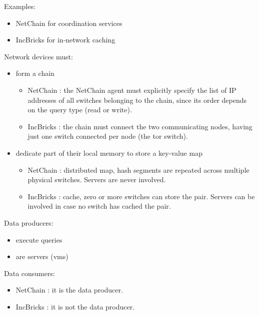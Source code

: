 Examples:
\begin{itemize}
    \item NetChain \cite{netchain} for coordination services
    \item IncBricks \cite{incbricks} for in-network caching
\end{itemize}
Network devices must:
\begin{itemize}
    \item form a chain
    \begin{itemize}
        \item NetChain \cite{netchain}: the NetChain \cite{netchain} agent must explicitly specify the list of IP addresses of all switches belonging to the chain, since its order depends on the query type (read or write).
        \item IncBricks \cite{incbricks}: the chain must connect the two communicating nodes, having just one switch connected per node (the \gls{tor} switch).
    \end{itemize}
    \item dedicate part of their local memory to store a key-value map
    \begin{itemize}
        \item NetChain \cite{netchain}: distributed map, hash segments are repeated across multiple physical switches. Servers are never involved.
        \item IncBricks \cite{incbricks}: cache, zero or more switches can store the pair. Servers can be involved in case no switch has cached the pair.
    \end{itemize}
\end{itemize}
Data producers:
\begin{itemize}
    \item execute queries
    \item are servers (\glspl{vm})
\end{itemize}
Data consumers:
\begin{itemize}
    \item NetChain \cite{netchain}: it is the data producer.
    \item IncBricks \cite{incbricks}: it is not the data producer.
\end{itemize}